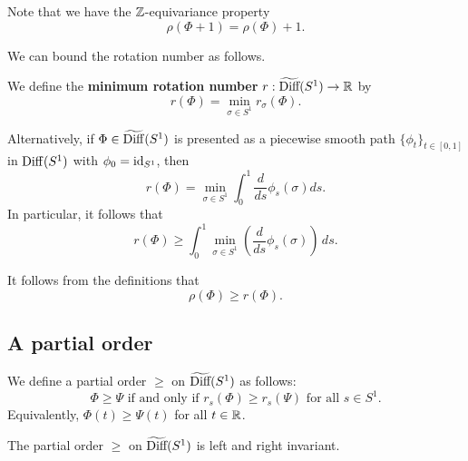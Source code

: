 Note that we have the ${\mathbb Z}$-equivariance property
\begin{equation}
\label{eqn:rhoequivariant}
\rho(\Phi+1)=\rho(\Phi)+1.
\end{equation}

We can bound the rotation number as follows.

\begin{definition}
We define the {\bf minimum rotation number\/} $r:\widetilde{\text{Diff}}(S^1)\to{\mathbb R}$ by
\begin{equation}
\label{eqn:def_of_dynamical_rotation}
r\left(\Phi\right) = \min_{\sigma\in S^1} r_\sigma\left(\Phi\right).
\end{equation}
\end{definition}

Alternatively, if $\Phi\in\widetilde{\operatorname{Diff}}(S^1)$ is presented as a piecewise smooth path $\{\phi_t\}_{t\in[0,1]}$ in $\operatorname{Diff}(S^1)$ with $\phi_0=\operatorname{id}_{S^1}$, then
\[
r(\Phi) = \min_{\sigma\in S^1}\int_0^1\frac{d}{ds}\phi_s(\sigma)ds.
\]
In particular, it follows that
\begin{equation}
\label{eqn:rminbound}
r(\Phi) \ge \int_0^1\min_{\sigma\in S^1}\left(\frac{d}{ds}\phi_s(\sigma)\right)\,ds.
\end{equation}

It follows from the definitions that
\begin{equation}
\label{eqn:rhor}
\rho(\Phi) \ge r(\Phi).
\end{equation}

\subsection{A partial order}

\begin{definition}
\label{def:order_on_DiffS1}
We define a partial order $\ge$ on $\widetilde{\text{Diff}}(S^1)$ as follows:
\begin{equation}
\Phi \ge \Psi \text{ if and only if } r_s(\Phi) \ge r_s(\Psi) \text{ for all }s \in S^1.
\end{equation}
Equivalently, $\Phi(t)\ge \Psi(t)$ for all $t\in{\mathbb R}$.
\end{definition}

\begin{lemma}
\label{lem:order_on_DiffS1_invariance}
The partial order $\ge$ on $\widetilde{\text{Diff}}(S^1)$ is left and right invariant.
\end{lemma}

